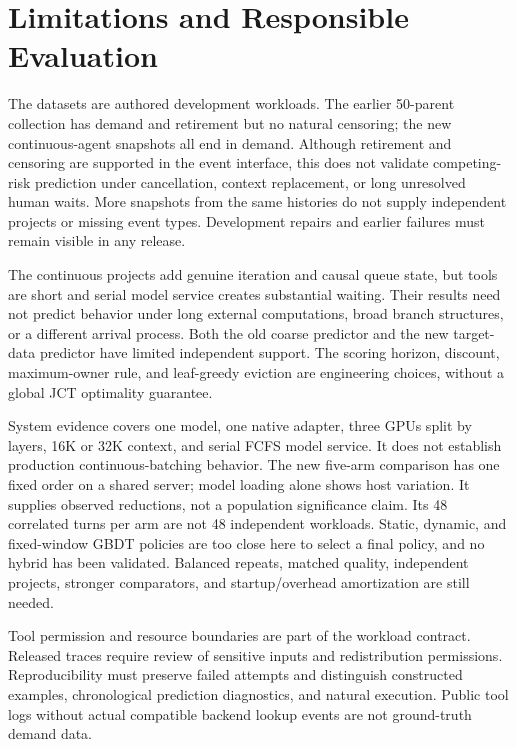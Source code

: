 \documentclass[sigconf, screen, review, balance=false]{acmart}
\begin{document}
\section{Limitations and Responsible Evaluation}
\label{limitations-and-responsible-evaluation}

The datasets are authored development workloads. The earlier 50-parent
collection has demand and retirement but no natural censoring; the new
continuous-agent snapshots all end in demand. Although retirement and
censoring are supported in the event interface, this does not validate
competing-risk prediction under cancellation, context replacement, or
long unresolved human waits. More snapshots from the same histories do
not supply independent projects or missing event types. Development
repairs and earlier failures must remain visible in any release.

The continuous projects add genuine iteration and causal queue state,
but tools are short and serial model service creates substantial
waiting. Their results need not predict behavior under long external
computations, broad branch structures, or a different arrival process.
Both the old coarse predictor and the new target-data predictor have
limited independent support. The scoring horizon, discount,
maximum-owner rule, and leaf-greedy eviction are engineering choices,
without a global JCT optimality guarantee.

System evidence covers one model, one native adapter, three GPUs split
by layers, 16K or 32K context, and serial FCFS model service. It does not
establish production continuous-batching behavior. The new five-arm
comparison has one fixed order on a shared server; model loading alone
shows host variation. It supplies observed reductions, not a population
significance claim. Its 48 correlated turns per arm are not 48
independent workloads. Static, dynamic, and fixed-window GBDT policies
are too close here to select a final policy, and no hybrid has been
validated. Balanced repeats, matched quality, independent projects,
stronger comparators, and startup/overhead amortization are still needed.

Tool permission and resource boundaries are part of the workload
contract. Released traces require review of sensitive inputs and
redistribution permissions. Reproducibility must preserve failed
attempts and distinguish constructed examples, chronological prediction
diagnostics, and natural execution. Public tool logs without actual
compatible backend lookup events are not ground-truth demand data.
\end{document}
